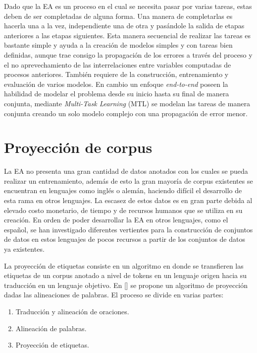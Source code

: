 Dado que la EA es un proceso en el cual se necesita pasar por varias tareas, estas deben de ser completadas
de alguna forma. Una manera de completarlas es hacerla una a la vez, independiente una de otra y pasándole
la salida de etapas anteriores a las etapas siguientes. Esta manera secuencial de realizar las 
tareas es bastante simple y ayuda a la creación de modelos simples y con tareas bien definidas, aunque trae consigo 
la propagación de los errores a través del proceso y el no aprevechamiento de las interrelaciones entre variables 
computadas de procesos anteriores. También requiere de la construcción, entrenamiento y evaluación de varios modelos.
En cambio un enfoque \emph{end-to-end} poseen la habilidad de modelar el problema 
desde su inicio hasta su final de manera conjunta, mediante \emph{Multi-Task Learning} (MTL) se modelan
las tareas de manera conjunta creando un solo modelo complejo con una propagación de error menor.

\section{Proyección de corpus}

La EA no presenta una gran cantidad de datos anotados con los cuales se pueda realizar 
un entrenamiento, además de esto la gran mayoría de corpus existentes se encuentran en lenguajes como inglés o alemán,
haciendo difícil el desarrollo de esta rama en otros lenguajes.
La escasez de estos datos es en gran parte debida al elevado costo monetario, de tiempo y de recursos humanos que se utiliza
en su creación. En orden de poder desarrollar la EA en otros lenguajes, como el español, se han investigado diferentes vertientes
para la construcción de conjuntos de datos en estos lenguajes de pocos recursos a partir de los conjuntos de datos ya 
existentes.

La proyección de etiquetas consiste en un algoritmo en donde se 
transfieren las etiquetas de un corpus anotado a nivel de tokens en un lenguaje origen hacia su traducción en un 
lenguaje objetivo. En [\cite{eger2018cross}] se propone un algoritmo de proyección dadas las alineaciones de 
palabras. El proceso se divide en varias partes:

\begin{enumerate}
	\item Traducción y alineación de oraciones.
	\item Alineación de palabras.
	\item Proyección de etiquetas.
\end{enumerate}

